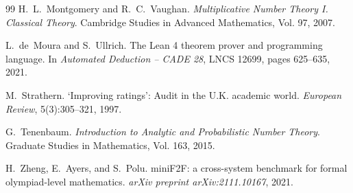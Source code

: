 \documentclass[11pt,a4paper]{article}
\theoremstyle{definition}
\theoremstyle{remark}
\begin{document}
\begin{thebibliography}{99}
H.~L.~Montgomery and R.~C.~Vaughan.
\newblock \emph{Multiplicative Number Theory I. Classical Theory}.
\newblock Cambridge Studies in Advanced Mathematics, Vol. 97, 2007.

L.~de~Moura and S.~Ullrich.
\newblock The {L}ean 4 theorem prover and programming language.
\newblock In \emph{Automated Deduction -- CADE 28}, LNCS 12699, pages 625--635, 2021.

M.~Strathern.
\newblock `Improving ratings': Audit in the {U.K.} academic world.
\newblock \emph{European Review}, 5(3):305--321, 1997.

G.~Tenenbaum.
\newblock \emph{Introduction to Analytic and Probabilistic Number Theory}.
\newblock Graduate Studies in Mathematics, Vol. 163, 2015.

H.~Zheng, E.~Ayers, and S.~Polu.
\newblock mini{F2F}: a cross-system benchmark for formal olympiad-level mathematics.
\newblock \emph{arXiv preprint arXiv:2111.10167}, 2021.

\end{thebibliography}
\end{document}
